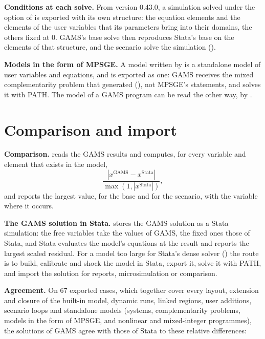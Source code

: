 \textbf{Conditions at each solve.} From version 0.43.0, a simulation solved
under the option  of  is exported with its own
structure: the equation elements and the elements of the user variables that
its parameters bring into their domains, the others fixed at 0. GAMS's base
solve then reproduces Stata's base on the elements of that structure, and the
scenario solve the simulation ().

\textbf{Models in the form of MPSGE.} A model written by  is
a standalone model of user variables and equations, and is exported as one:
GAMS receives the mixed complementarity problem that 
generated (), not MPSGE's statements, and solves it with
PATH. The model of a GAMS program can be read the other way, by
.

\section{Comparison and import}\label{sec:gams-import}

\textbf{Comparison.}  reads the GAMS results and computes, for
every variable and element that exists in the model,
\begin{equation*}
\frac{|x^{\text{GAMS}} - x^{\text{Stata}}|}{\max(1, |x^{\text{Stata}}|)},
\end{equation*}
and reports the largest value, for the base and for the scenario, with the
variable where it occurs.

\textbf{The GAMS solution in Stata.}  stores the GAMS solution as
a Stata simulation: the free variables take the values of GAMS, the fixed ones
those of Stata, and Stata evaluates the model's equations at the result and
reports the largest scaled residual. For a model too large for Stata's dense
solver () the route is to build, calibrate and shock
the model in Stata, export it, solve it with PATH, and import the solution for
reports, microsimulation or comparison.

\textbf{Agreement.} On 67 exported cases, which together cover every layout,
extension and closure of the built-in model, dynamic runs, linked regions,
user additions, scenario loops and standalone models (systems,
complementarity problems, models in the form of MPSGE, and nonlinear and
mixed-integer programmes), the solutions of GAMS agree with those of Stata
to these relative differences:

